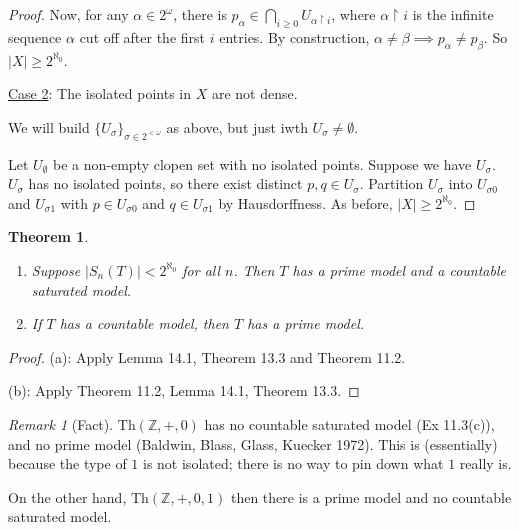 \documentclass[]{article}
\theoremstyle{custhm}
\newtheorem{theorem}{Theorem}[section]
\theoremstyle{cusdef}
\theoremstyle{custhm}
\theoremstyle{custhm}
\theoremstyle{custhm}
\theoremstyle{ex}
\theoremstyle{custhm}
\theoremstyle{cusdef}
\theoremstyle{remark}
\newtheorem*{remark*}{Remark}
\theoremstyle{remark}
\newcommand{\Z}{\mathbb{Z}}
\newcommand{\Th}{\textrm{Th}}
\begin{document}
\begin{proof}
	Now, for any $\alpha \in 2^\omega$, there is $p_\alpha \in \bigcap_{i\ge 0}U_{\alpha\upharpoonright i}$, where $\alpha \upharpoonright i$ is the infinite sequence $\alpha$ cut off after the first $i$ entries. By construction, $\alpha \ne \beta\implies p_\alpha \ne p_\beta$. So $|X|\ge 2^{\aleph_0}$.

	\underline{Case 2}: The isolated points in $X$ are not dense.

	We will build $\{U_\sigma\}_{\sigma \in 2^{<\omega}}$ as above, but just iwth $U_\sigma \ne \emptyset$.

	Let $U_\emptyset$ be a non-empty clopen set with no isolated points. Suppose we have $U_\sigma$. $U_\sigma$ has no isolated points, so there exist distinct $p,q \in U_\sigma$. Partition $U_\sigma$ into $U_{\sigma 0}$ and $U_{\sigma 1}$ with $p \in U_{\sigma 0}$ and $q \in U_{\sigma 1}$ by Hausdorffness. As before, $|X|\ge 2^{\aleph_0}$.
\end{proof}

\begin{theorem}\ 
	\begin{enumerate}[label=\alph*)]
		\item Suppose $|S_n(T)|<2^{\aleph_0}$ for all $n$. Then $T$ has a prime model and a countable saturated model.
		\item If $T$ has a countable model, then $T$ has a prime model.
	\end{enumerate}
\end{theorem}
\begin{proof} (a): Apply Lemma 14.1, Theorem 13.3 and Theorem 11.2.

	(b): Apply Theorem 11.2, Lemma 14.1, Theorem 13.3.
\end{proof}

\begin{remark*}[Fact]
$\Th(\Z,+,0)$ has no countable saturated model (Ex 11.3(c)), and no prime model (Baldwin, Blass, Glass, Kuecker 1972). This is (essentially) because the type of $1$ is not isolated; there is no way to pin down what $1$ really is.

On the other hand, $\Th(\Z,+,0,1)$ then there is a prime model and no countable saturated model.
\end{remark*}
\end{document}
